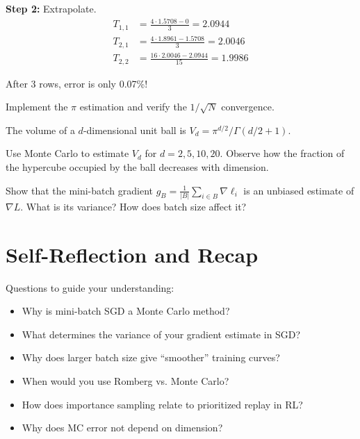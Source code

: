 \textbf{Step 2:} Extrapolate.
\begin{align*}
    T_{1,1} &= \frac{4 \cdot 1.5708 - 0}{3} = 2.0944 \\
    T_{2,1} &= \frac{4 \cdot 1.8961 - 1.5708}{3} = 2.0046 \\
    T_{2,2} &= \frac{16 \cdot 2.0046 - 2.0944}{15} = 1.9986
\end{align*}

After 3 rows, error is only 0.07\%!


\vspace{2em}
 Implement the $\pi$ estimation and verify the $1/\sqrt{N}$ convergence.


\vspace{2em}
 The volume of a $d$-dimensional unit ball is $V_d = \pi^{d/2}/\Gamma(d/2 + 1)$.

Use Monte Carlo to estimate $V_d$ for $d = 2, 5, 10, 20$. Observe how the fraction of the hypercube occupied by the ball decreases with dimension.


\vspace{2em}
 Show that the mini-batch gradient $g_B = \frac{1}{|B|}\sum_{i \in B} \nabla \ell_i$ is an unbiased estimate of $\nabla L$. What is its variance? How does batch size affect it?




\newpage
\section{Self-Reflection and Recap}

 Questions to guide your understanding:
\begin{itemize}
    \item Why is mini-batch SGD a Monte Carlo method?
    \item What determines the variance of your gradient estimate in SGD?
    \item Why does larger batch size give ``smoother'' training curves?
    \item When would you use Romberg vs. Monte Carlo?
    \item How does importance sampling relate to prioritized replay in RL?
    \item Why does MC error not depend on dimension?
\end{itemize}

